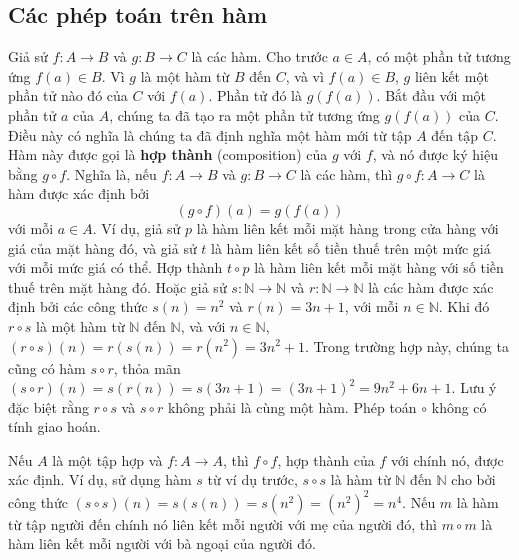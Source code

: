 \subsection{Các phép toán trên hàm}

Giả sử $f\colon A \to B$ và $g\colon B \to C$ là các hàm. Cho trước $a \in A$, có một phần tử tương ứng $f(a) \in B$. Vì $g$ là một hàm từ $B$ đến $C$, và vì $f(a) \in B$, $g$ liên kết một phần tử nào đó của $C$ với $f(a)$. Phần tử đó là $g(f(a))$. Bắt đầu với một phần tử $a$ của $A$, chúng ta đã tạo ra một phần tử tương ứng $g(f(a))$ của $C$. Điều này có nghĩa là chúng ta đã định nghĩa một hàm mới từ tập $A$ đến tập $C$. Hàm này được gọi là \textbf{hợp thành} (composition) của $g$ với $f$, và nó được ký hiệu bằng $g \circ f$. Nghĩa là, nếu $f\colon A \to B$ và $g\colon B \to C$ là các hàm, thì $g \circ f\colon A \to C$ là hàm được xác định bởi
\[
(g \circ f)(a) = g(f(a))
\]
với mỗi $a \in A$. Ví dụ, giả sử $p$ là hàm liên kết mỗi mặt hàng trong cửa hàng với giá của mặt hàng đó, và giả sử $t$ là hàm liên kết số tiền thuế trên một mức giá với mỗi mức giá có thể. Hợp thành $t \circ p$ là hàm liên kết mỗi mặt hàng với số tiền thuế trên mặt hàng đó. Hoặc giả sử $s\colon \mathbb{N} \to \mathbb{N}$ và $r\colon \mathbb{N} \to \mathbb{N}$ là các hàm được xác định bởi các công thức $s(n) = n^2$ và $r(n) = 3n + 1$, với mỗi $n \in \mathbb{N}$. Khi đó $r \circ s$ là một hàm từ $\mathbb{N}$ đến $\mathbb{N}$, và với $n \in \mathbb{N}$, $(r \circ s)(n) = r(s(n)) = r(n^2) = 3n^2 + 1$. Trong trường hợp này, chúng ta cũng có hàm $s \circ r$, thỏa mãn $(s \circ r)(n) = s(r(n)) = s(3n+1) = (3n+1)^2 = 9n^2 + 6n + 1$. Lưu ý đặc biệt rằng $r \circ s$ và $s \circ r$ không phải là cùng một hàm. Phép toán $\circ$ không có tính giao hoán.

Nếu $A$ là một tập hợp và $f\colon A \to A$, thì $f \circ f$, hợp thành của $f$ với chính nó, được xác định. Ví dụ, sử dụng hàm $s$ từ ví dụ trước, $s \circ s$ là hàm từ $\mathbb{N}$ đến $\mathbb{N}$ cho bởi công thức $(s \circ s)(n) = s(s(n)) = s(n^2) = (n^2)^2 = n^4$. Nếu $m$ là hàm từ tập người đến chính nó liên kết mỗi người với mẹ của người đó, thì $m \circ m$ là hàm liên kết mỗi người với bà ngoại của người đó.

